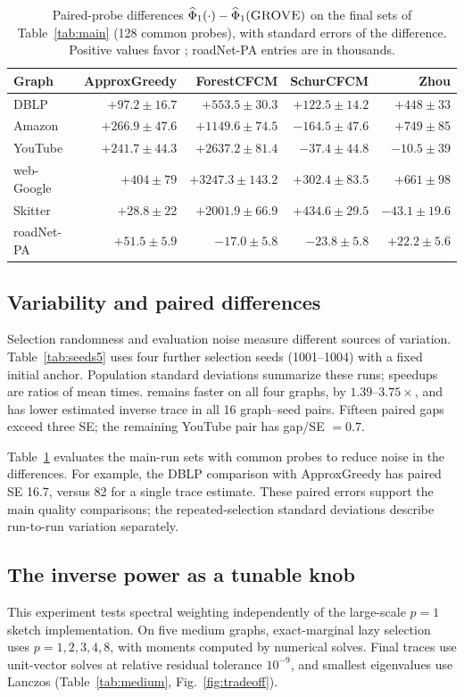 \begin{table}[t]
\centering\footnotesize
\caption{Paired-probe differences $\widehat\Phi_1(\cdot)-\widehat\Phi_1(\textsc{GROVE}{})$
on the final sets of Table~\ref{tab:main} (128 common probes), with
standard errors of the difference. Positive values favor \alg{};
roadNet-PA entries are in thousands.}\label{tab:paired}
\setlength{\tabcolsep}{2pt}
\begin{tabular}{@{}lrrrr@{}}\toprule
Graph & ApproxGreedy & ForestCFCM & SchurCFCM & Zhou\\\midrule
DBLP & $+97.2\pm16.7$ & $+553.5\pm30.3$ & $+122.5\pm14.2$ & $+448\pm33$\\
Amazon & $+266.9\pm47.6$ & $+1149.6\pm74.5$ & $-164.5\pm47.6$ & $+749\pm85$\\
YouTube & $+241.7\pm44.3$ & $+2637.2\pm81.4$ & $-37.4\pm44.8$ & $-10.5\pm39$\\
web-Google & $+404\pm79$ & $+3247.3\pm143.2$ & $+302.4\pm83.5$ & $+661\pm98$\\
Skitter & $+28.8\pm22$ & $+2001.9\pm66.9$ & $+434.6\pm29.5$ & $-43.1\pm19.6$\\
roadNet-PA & $+51.5\pm5.9$ & $-17.0\pm5.8$ & $-23.8\pm5.8$ & $+22.2\pm5.6$\\
\bottomrule\end{tabular}
\end{table}

\subsection{Variability and paired differences}\label{sec:variability}
Selection randomness and evaluation noise measure different sources
of variation. Table~\ref{tab:seeds5} uses four further selection
seeds (1001--1004) with a fixed initial anchor. Population standard deviations
summarize these runs; speedups are ratios of mean times.
\alg{} remains faster on all four graphs, by $1.39$--$3.75\times$,
and has lower estimated inverse trace in all 16 graph--seed pairs.
Fifteen paired gaps exceed three SE; the remaining YouTube pair has
gap/SE $=0.7$.

Table~\ref{tab:paired} evaluates the main-run sets with common
probes to reduce noise in the differences. For example, the DBLP
comparison with ApproxGreedy has paired SE 16.7, versus 82 for a
single trace estimate. These paired errors support the main quality
comparisons; the repeated-selection standard deviations describe
run-to-run variation separately.

\subsection{The inverse power as a tunable knob}\label{sec:powers}
This experiment tests spectral weighting independently of the
large-scale $p=1$ sketch implementation. On five medium graphs,
exact-marginal lazy selection uses $p=1,2,3,4,8$, with moments
computed by numerical solves. Final traces use unit-vector solves
at relative residual tolerance $10^{-9}$, and smallest eigenvalues
use Lanczos (Table~\ref{tab:medium}, Fig.~\ref{fig:tradeoff}).

